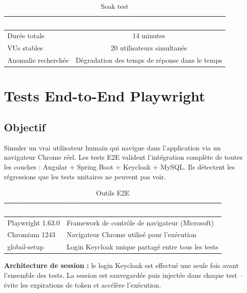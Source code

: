 \documentclass[12pt,a4paper]{report}
\newcommand{\thead}[1]{\cellcolor{tablehead}\textcolor{white}{\textbf{#1}}}
\begin{document}
\begin{table}[H]
  \centering
  \caption{Soak test}
  \label{tab:tests_soak}
  \begin{tabularx}{\textwidth}{|l|c|}
    \hline
    \thead{Paramètre} & \thead{Valeur} \\
    \hline
    Durée totale & 14 minutes \\
    VUs stables & 20 utilisateurs simultanés \\
    Anomalie recherchée & Dégradation des temps de réponse dans le temps \\
    \hline
  \end{tabularx}
\end{table}

\section{Tests End-to-End Playwright}
\label{sec:ch9-e2e}

\subsection{Objectif}

Simuler un vrai utilisateur humain qui navigue dans l'application via un
navigateur Chrome réel. Les tests E2E valident l'intégration complète de
toutes les couches : Angular + Spring Boot + Keycloak + MySQL. Ils
détectent les régressions que les tests unitaires ne peuvent pas voir.

\begin{table}[H]
  \centering
  \caption{Outils E2E}
  \label{tab:tests_outils_e2e}
  \begin{tabularx}{\textwidth}{|l|Y|}
    \hline
    \thead{Outil} & \thead{Rôle} \\
    \hline
    Playwright 1.63.0 & Framework de contrôle de navigateur (Microsoft) \\
    Chromium 1243 & Navigateur Chrome utilisé pour l'exécution \\
    global-setup & Login Keycloak unique partagé entre tous les tests \\
    \hline
  \end{tabularx}
\end{table}

\textbf{Architecture de session :} le login Keycloak est effectué une
seule fois avant l'ensemble des tests. La session est sauvegardée puis
injectée dans chaque test -- évite les expirations de token et accélère
l'exécution.
\end{document}
